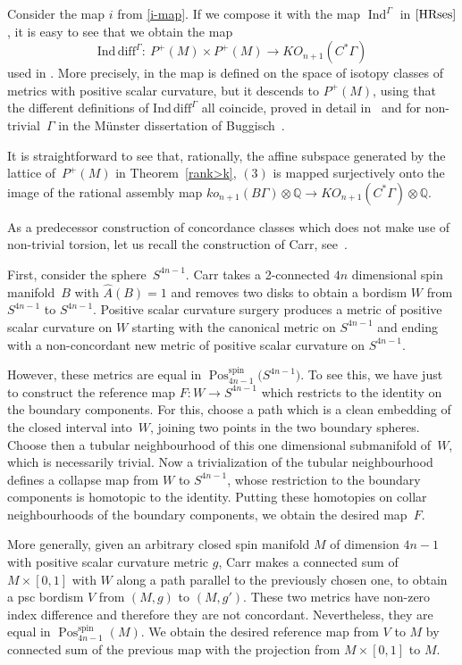 \documentclass[10pt,a4paper]{amsart}
\numberwithin{equation}{section}
\def\QQ{\ensuremath{\mathbb{Q}}}
\DeclareMathOperator{\Ind}{Ind}
\DeclareMathOperator{\Pos}{Pos}
\DeclareMathOperator{\spin}{spin}
\begin{document}
\begin{Remark}Consider the map $i$ from \eqref{i-map}. If we compose it
 with the map ${\Ind}^{\Gamma}$ in $\eqref{HRses}$, it is easy to see
 that we obtain the map \[\mathrm{Ind\, diff}^\Gamma\colon \ P^+(M)\times
 P^+(M)\to KO_{n+1}(C^*\Gamma)\] used in \cite[Section~5.3]{EbertRW}. More
 precisely, in \cite{EbertRW} the map is defined on the space of isotopy
 classes of metrics with positive scalar curvature, but it descends to
 $P^+(M)$, using that the different definitions of $\mathrm{Ind\,diff}^\Gamma$ all
 coincide, proved in detail in~\cite{Ebert_inddiff} and for non-trivial~$\Gamma$ in the M\"unster dissertation of Buggisch~\cite{Buggisch}.

 It is straightforward to see that, rationally, the affine subspace generated by the lattice of~$P^+(M)$ in Theorem~\ref{rank>k}, $(3)$ is mapped surjectively onto
 the image of the rational assembly map $ko_{n+1}(B\Gamma)\otimes\QQ\to KO_{n+1}(C^*\Gamma)\otimes\QQ$.
\end{Remark}

\begin{Remark}\label{carr}
 As a predecessor construction of concordance classes which does not make use of non-trivial torsion, let us recall the construction of Carr, see~\cite{Carr}.

 First, consider the sphere~$S^{4n-1}$. Carr takes a 2-connected $4n$ dimensional spin manifold~$B$ with $\hat{A}(B)=1$ and removes two disks to obtain a bordism $W$ from $S^{4n-1}$ to $S^{4n-1}$. Positive scalar curvature surgery produces a metric of positive scalar curvature on $W$ starting with the canonical metric on $S^{4n-1}$ and ending with a non-concordant new metric of positive scalar curvature on $S^{4n-1}$.

 However, these metrics are equal in $\Pos^{\spin}_{4n-1}\big(S^{4n-1}\big)$. To see this, we have just to construct the reference map $F\colon W\to S^{4n-1}$ which restricts to the identity on the boundary components.
 For this, choose a path which is a clean embedding of the closed interval into~$W$, joining two points in the two boundary spheres. Choose then a tubular neighbourhood of this one dimensional submanifold of~$W$, which is necessarily trivial. Now a trivialization of the tubular neighbourhood defines a collapse map from $W$ to $S^{4n-1}$, whose restriction to the boundary components is homotopic to the identity. Putting these homotopies on collar neighbourhoods of the boundary components, we obtain the desired map~$F$.

 More generally, given an arbitrary closed spin manifold $M$ of dimension $4n-1$ with positive scalar curvature metric $g$, Carr makes a connected sum of $M\times [0,1]$ with $W$ along a path parallel to the previously chosen one, to obtain a psc bordism $V$ from $(M,g)$ to $(M,g')$. These two metrics have non-zero index difference and therefore they are not concordant.
 Nevertheless, they are equal in $\Pos^{\spin}_{4n-1}(M)$. We obtain the desired reference map from $V $ to $M$ by connected sum of the previous map with the projection from $M\times [0,1]$ to $M$.
\end{Remark}
\end{document}
